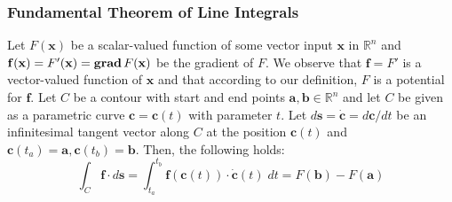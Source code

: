\subsubsection{Fundamental Theorem of Line Integrals}
Let $F(\mathbf{x})$ be a scalar-valued function of some vector input $\mathbf{x}$ in $\mathbb{R}^n$ and $\mathbf{f(x)} = F'(\mathbf{x}) = \operatorname{\mathbf{grad}} F(\mathbf{x})$ be the gradient of $F$. We observe that $\mathbf{f} = F'$ is a vector-valued function of $\mathbf{x}$ and that according to our definition, $F$ is a potential for $\mathbf{f}$. Let $C$ be a contour with start and end points $\mathbf{a,b} \in \mathbb{R}^n$ and let $C$ be given as a parametric curve $\mathbf{c} = \mathbf{c}(t)$ with parameter $t$. Let $d\mathbf{s} = \dot{\mathbf{c}} = d\mathbf{c} / dt$ be an infinitesimal tangent vector along $C$ at the position $\mathbf{c}(t)$ and $\mathbf{c}(t_a) = \mathbf{a}, \mathbf{c}(t_b) = \mathbf{b}$. Then, the following holds:
\begin{equation}
 \int_C \mathbf{f} \cdot d\mathbf{s}  =
 \int_{t_a}^{t_b}  \mathbf{f} (\mathbf{c}(t) ) \cdot \dot{\mathbf{c}}(t) \; dt =
 F(\mathbf{b}) - F(\mathbf{a}) 
\end{equation}
